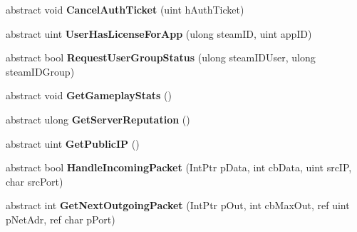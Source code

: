 \begin{DoxyCompactItemize}
abstract void {\bfseries Cancel\+Auth\+Ticket} (uint h\+Auth\+Ticket)
\item 
\mbox{\label{class_valve_1_1_steamworks_1_1_i_steam_game_server_a8255b8ed791916b5d6ad1ed7eb51b329}} 
abstract uint {\bfseries User\+Has\+License\+For\+App} (ulong steam\+ID, uint app\+ID)
\item 
\mbox{\label{class_valve_1_1_steamworks_1_1_i_steam_game_server_ab0c42bc0b480df9809fcbd7812a322a7}} 
abstract bool {\bfseries Request\+User\+Group\+Status} (ulong steam\+I\+D\+User, ulong steam\+I\+D\+Group)
\item 
\mbox{\label{class_valve_1_1_steamworks_1_1_i_steam_game_server_acd15fd5c2e146b7c052625b8988be9e5}} 
abstract void {\bfseries Get\+Gameplay\+Stats} ()
\item 
\mbox{\label{class_valve_1_1_steamworks_1_1_i_steam_game_server_a378abfc80e1f2c7943bd0e31de1e0318}} 
abstract ulong {\bfseries Get\+Server\+Reputation} ()
\item 
\mbox{\label{class_valve_1_1_steamworks_1_1_i_steam_game_server_a0ef1854cdf73fbe40576c63a7a6b75ca}} 
abstract uint {\bfseries Get\+Public\+IP} ()
\item 
\mbox{\label{class_valve_1_1_steamworks_1_1_i_steam_game_server_acc1e185ef7c03552517ac89fd50b3907}} 
abstract bool {\bfseries Handle\+Incoming\+Packet} (Int\+Ptr p\+Data, int cb\+Data, uint src\+IP, char src\+Port)
\item 
\mbox{\label{class_valve_1_1_steamworks_1_1_i_steam_game_server_aaa122246fae2232c7a1f737e3b1d1654}} 
abstract int {\bfseries Get\+Next\+Outgoing\+Packet} (Int\+Ptr p\+Out, int cb\+Max\+Out, ref uint p\+Net\+Adr, ref char p\+Port)
\item 
\mbox{\label{class_valve_1_1_steamworks_1_1_i_steam_game_server_a88889e39263525da1130fb7547c6875f}} 

\end{DoxyCompactItemize}

